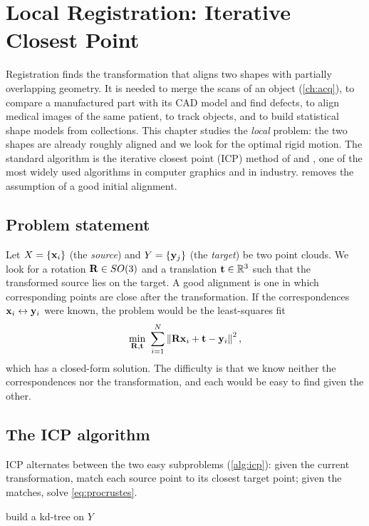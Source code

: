 \chapter{Local Registration: Iterative Closest Point}\label{ch:icp}

Registration finds the transformation that aligns two shapes with partially overlapping geometry.
It is needed to merge the scans of an object (\cref{ch:acq}), to compare a manufactured part with
its CAD model and find defects, to align medical images of the same patient, to track objects, and
to build statistical shape models from collections. This chapter studies the \emph{local}
problem: the two shapes are already roughly aligned and we look for the optimal rigid motion. The
standard algorithm is the iterative closest point (ICP) method of \citet{Besl1992} and
\citet{Chen1992}, one of the most widely used algorithms in computer graphics and in industry.
 removes the assumption of a good initial alignment.

\section{Problem statement}

Let $X=\{\mathbf{x}_i\}$ (the \emph{source}) and $Y=\{\mathbf{y}_j\}$ (the \emph{target}) be two point clouds.
We look for a rotation $\mathbf{R}\in SO(3)$ and a translation $\mathbf{t}\in\mathbb{R}^3$ such that the transformed
source lies on the target. A good alignment is one in which corresponding points are close after
the transformation. If the correspondences $\mathbf{x}_i\leftrightarrow\mathbf{y}_i$ were known, the problem
would be the least-squares fit
\begin{equation}
\min_{\mR,\bt}\ \sum_{i=1}^N\norm{\mR\bx_i+\bt-\by_i}^2 ,
\label{eq:procrustes}
\end{equation}
which has a closed-form solution. The difficulty is that we know neither the correspondences nor
the transformation, and each would be easy to find given the other.

\section{The ICP algorithm}

ICP alternates between the two easy subproblems (\cref{alg:icp}): given the current
transformation, match each source point to its closest target point; given the matches, solve
\eqref{eq:procrustes}.

\begin{algorithm}[tbp]
\caption{Iterative closest point (point-to-point).}\label{alg:icp}
build a kd-tree on $Y$\;
\end{algorithm}

